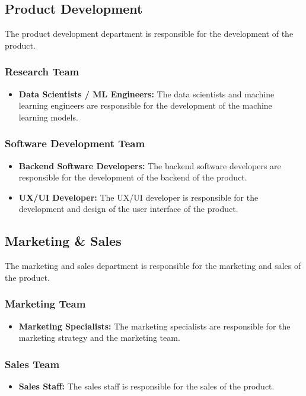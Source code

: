 \subsection{Product Development}
The product development department is responsible for the development of the product.

\subsubsection*{Research Team}
\begin{itemize}
    \item \textbf{Data Scientists / ML Engineers:} The data scientists and machine learning engineers are responsible for the development of the machine learning models.
\end{itemize}

\subsubsection*{Software Development Team}
\begin{itemize}
    \item \textbf{Backend Software Developers:} The backend software developers are responsible for the development of the backend of the product.
    \item \textbf{UX/UI Developer:} The UX/UI developer is responsible for the development and design of the user interface of the product.
\end{itemize}

\subsection{Marketing \& Sales}
The marketing and sales department is responsible for the marketing and sales of the product.
\subsubsection*{Marketing Team}
\begin{itemize}
    \item \textbf{Marketing Specialists:} The marketing specialists are responsible for the marketing strategy and the marketing team.
\end{itemize}

\subsubsection*{Sales Team}
\begin{itemize}
    \item \textbf{Sales Staff:} The sales staff is responsible for the sales of the product.
\end{itemize}

